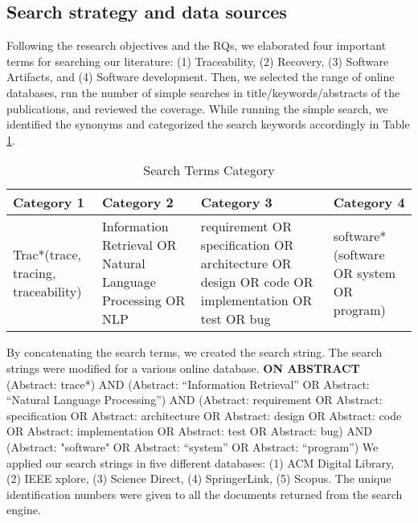 \documentclass[conference]{IEEEtran}
\begin{document}
\subsection{Search strategy and data sources}
Following the research objectives and the RQs, we elaborated four important terms for searching our literature: (1) Traceability, (2) Recovery, (3) Software Artifacts, and (4) Software development. Then, we selected the range of online databases, run the number of simple searches in title/keywords/abstracts of the publications, and reviewed the coverage. While running the simple search, we identified the synonyms and categorized the search keywords accordingly in Table \ref{table:SearchStrings}.

\begin{table}[h!]
\begin{tabular} {|p{1.8cm}|p{1.8cm}|p{1.8cm}|p{1.8cm}| }
\hline
Category 1 & Category 2 & Category 3 & Category 4\\
\hline
Trac*(trace, tracing, traceability) & Information Retrieval OR Natural Language Processing OR NLP
 & requirement OR specification
OR architecture
OR
design OR code
OR
implementation
OR test OR bug
 & software*
(software OR
system OR
program) \\
\hline
\end{tabular}
\caption{Search Terms Category}
\label{table:SearchStrings}
\end{table}

By concatenating the search terms, we created the search string. The search strings were modified for a various online database.
\textbf{ON ABSTRACT} (Abstract: trace*) AND (Abstract: “Information Retrieval” OR Abstract: “Natural Language Processing”) AND (Abstract: requirement OR Abstract: specification OR Abstract: architecture OR Abstract: design OR Abstract: code OR Abstract: implementation OR Abstract: test OR Abstract: bug) AND (Abstract: "software" OR Abstract: “system” OR Abstract:
“program”) 
\newline
We applied our search strings in five different databases: (1) ACM Digital Library, (2) IEEE xplore, (3) Science Direct, (4) SpringerLink, (5) Scopus. The unique identification numbers were given to all the documents returned from the search engine.
\end{document}
